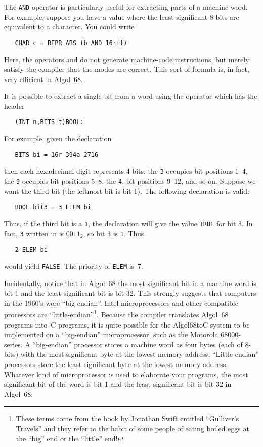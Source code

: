 The \verb|AND| operator is particularly useful for extracting parts
of a machine word. For example, suppose you have a  value
where the least-significant 8 bits are equivalent to a character. You
could write
\begin{verbatim}
   CHAR c = REPR ABS (b AND 16rff)
\end{verbatim}
\noindent
Here, the operators  and  do not generate
mach\-ine-code instructions, but merely satisfy the compiler that the
modes are correct. This sort of formula is, in fact, very efficient
in Algol~68.

It is possible to extract a single bit from a word using the operator
 which has the header
\begin{verbatim}
   (INT n,BITS t)BOOL:
\end{verbatim}
\noindent
For example, given the declaration
\begin{verbatim}
   BITS bi = 16r 394a 2716
\end{verbatim}
\noindent
then each hexadecimal digit represents 4 bits: the \verb|3| occupies
bit positions 1--4, the \verb|9| occupies bit positions 5--8, the
\verb|4|, bit positions 9--12, and so on. Suppose we want the third bit
(the leftmost bit is bit-1). The following declaration is valid:
\begin{verbatim}
   BOOL bit3 = 3 ELEM bi
\end{verbatim}
\noindent
Thus, if the third bit is a \verb|1|, the declaration will give the
value \verb|TRUE| for bit 3.  In fact, \verb|3| written in
 is $0011_2$, so bit 3 is \verb|1|. Thus
\begin{verbatim}
   2 ELEM bi
\end{verbatim}
\noindent
would yield \verb|FALSE|. The priority of \verb|ELEM| is~7.

Incidentally, notice that in Algol~68 the most significant bit in a
machine word is bit-1 and the least significant bit is bit-32. This
strongly suggests that computers in the 1960's were ``big-endian''.
Intel microprocessors and other compatible processors are
``little-endian''\footnote{These terms come from the book by Jonathan
Swift entitled ``Gulliver's Travels'' and they refer to the habit of
some people of eating boiled eggs at the ``big'' end or the
``little'' end!}. Because the  compiler translates
Algol~68 programs into~C programs, it is quite possible for the
Algol68toC system to be implemented on a ``big-endian''
microprocessor, such as the Motorola 68000-series. A ``big-endian''
processor stores a machine word as four bytes (each of 8-bits) with
the most significant byte at the lowest memory address.
``Little-endian'' processors store the least significant byte at the
lowest memory address. Whatever kind of microprocessor is used to
elaborate your programs, the most significant bit of the word is
bit-1 and the least significant bit is bit-32 in Algol~68.

